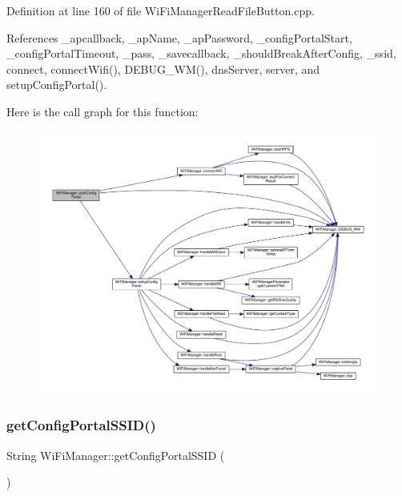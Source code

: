 Definition at line 160 of file Wi\+Fi\+Manager\+Read\+File\+Button.\+cpp.



References \+\_\+apcallback, \+\_\+ap\+Name, \+\_\+ap\+Password, \+\_\+config\+Portal\+Start, \+\_\+config\+Portal\+Timeout, \+\_\+pass, \+\_\+savecallback, \+\_\+should\+Break\+After\+Config, \+\_\+ssid, connect, connect\+Wifi(), D\+E\+B\+U\+G\+\_\+\+W\+M(), dns\+Server, server, and setup\+Config\+Portal().

Here is the call graph for this function\+:\nopagebreak
\begin{figure}[H]
\begin{center}
\leavevmode
\includegraphics[width=350pt]{d4/dc8/class_wi_fi_manager_afaca5021edffb4d9a5bd39f7b0f7a686_cgraph}
\end{center}
\end{figure}
\mbox{\label{class_wi_fi_manager_a157dc79b810f8f8d338a6120b13f5c94}} 
\subsubsection{\texorpdfstring{get\+Config\+Portal\+S\+S\+I\+D()}{getConfigPortalSSID()}}
{\footnotesize\ttfamily String Wi\+Fi\+Manager\+::get\+Config\+Portal\+S\+S\+ID (\begin{DoxyParamCaption}{ }\end{DoxyParamCaption})}



